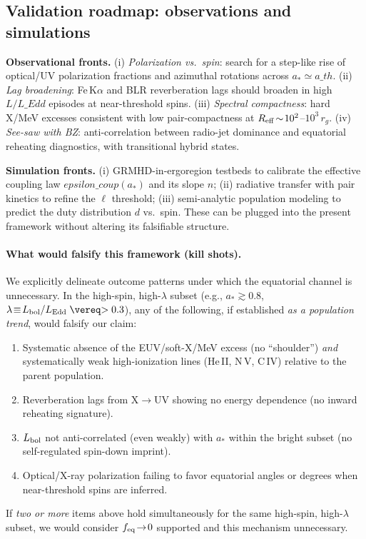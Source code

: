 \documentclass[twocolumn]{aastex701}
\newcommand{\ath}{a_{\rm th}}
\newcommand{\rg}{r_g}
\newcommand{\LEdd}{L_{\rm Edd}}
\newcommand{\Ltot}{L_{\rm tot}}
\newcommand{\FeKa}{\mathrm{Fe\,K}\alpha}
\newcommand{\epscoup}{\epsilon_{\rm coup}}
\newcommand{\aeq}{a_{\rm eq}}
\def\ath{a\_th}\def\rg{r\_g}\def\LEdd{L\_Edd}\def\Ltot{L\_tot}\def\FeKa{Fe K\string\alpha}%
\def\epscoup{epsilon\_coup}\def\aeq{a\_eq}\def\mathrm#1{#1}%
\begin{document}
\subsection*{Validation roadmap: observations and simulations}
\noindent\textbf{Observational fronts.}
(i) \textit{Polarization vs.\ spin}: search for a step-like rise of optical/UV polarization fractions and azimuthal rotations across $a_\ast\simeq \ath$. (ii) \textit{Lag broadening}: Fe\,K$\alpha$ and BLR reverberation lags should broaden in high $L/\LEdd$ episodes at near-threshold spins. (iii) \textit{Spectral compactness}: hard X/MeV excesses consistent with low pair-compactness at $R_{\rm eff}\!\sim\!10^{2}$–$10^{3}\,r_g$. (iv) \textit{See-saw with BZ}: anti-correlation between radio-jet dominance and equatorial reheating diagnostics, with transitional hybrid states.

\noindent\textbf{Simulation fronts.}
(i) GRMHD-in-ergoregion testbeds to calibrate the effective coupling law $\epscoup(a_\ast)$ and its slope $n$; (ii) radiative transfer with pair kinetics to refine the $\ell$ threshold; (iii) semi-analytic population modeling to predict the duty distribution $d$ vs.\ spin. These can be plugged into the present framework without altering its falsifiable structure.

\paragraph{What would falsify this framework (kill shots).}
We explicitly delineate outcome patterns under which the equatorial channel is unnecessary. In the high-spin, high-$\lambda$ subset (e.g., $a_*\gtrsim0.8$, $\lambda\!\equiv\!L_{\rm bol}/L_{\rm Edd}\gtrsim0.3$), any of the following, if established \emph{as a population trend}, would falsify our claim:
\begin{enumerate}
\item Systematic absence of the EUV/soft-X/MeV excess (no ``shoulder'') \emph{and} systematically weak high-ionization lines (He\,II, N\,V, C\,IV) relative to the parent population.
\item Reverberation lags from X$\rightarrow$UV showing no energy dependence (no inward reheating signature).
\item $L_{\rm bol}$ not anti-correlated (even weakly) with $a_*$ within the bright subset (no self-regulated spin-down imprint).
\item Optical/X-ray polarization failing to favor equatorial angles or degrees when near-threshold spins are inferred.
\end{enumerate}
If \emph{two or more} items above hold simultaneously for the same high-spin, high-$\lambda$ subset, we would consider $f_{\rm eq}\!\to\!0$ supported and this mechanism unnecessary.
\end{document}
